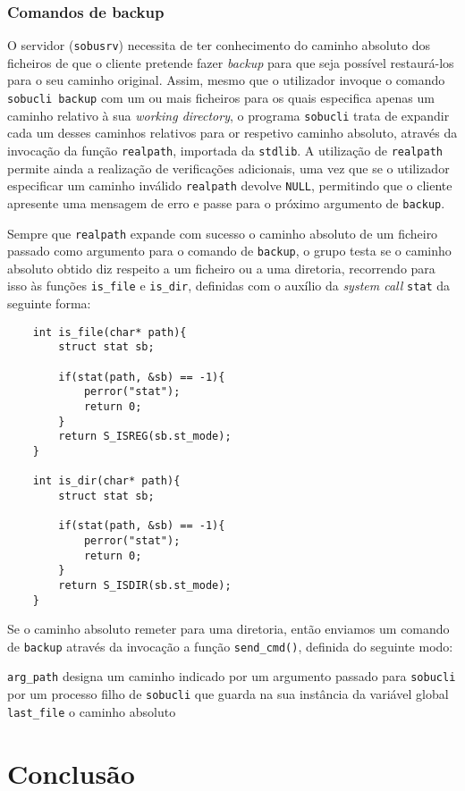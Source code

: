 \documentclass[a4paper,12pt,titlepage,draft,portuguese]{article}
\begin{document}
\subsubsection{Comandos de backup}

O servidor (\texttt{sobusrv}) necessita de ter conhecimento do caminho absoluto dos ficheiros de que o cliente pretende fazer \emph{backup} para que seja possível restaurá-los para o seu caminho original. Assim, mesmo que o utilizador invoque o comando \texttt{sobucli backup} com um ou mais ficheiros para os quais especifica apenas um caminho relativo à sua \emph{working directory}, o programa \texttt{sobucli} trata de expandir cada um desses caminhos relativos para or respetivo caminho absoluto, através da invocação da função \texttt{realpath}, importada da \texttt{stdlib}. A utilização de \texttt{realpath} permite ainda a realização de verificações adicionais, uma vez que se o utilizador especificar um caminho inválido \texttt{realpath} devolve \texttt{NULL}, permitindo que o cliente apresente uma mensagem de erro e passe para o próximo argumento de \texttt{backup}.

Sempre que \texttt{realpath} expande com sucesso o caminho absoluto de um ficheiro passado como argumento para o comando de \texttt{backup}, o grupo testa se o caminho absoluto obtido diz respeito a um ficheiro ou a uma diretoria, recorrendo para isso às funções \texttt{is\_file} e \texttt{is\_dir}, definidas com o auxílio da \emph{system call} \texttt{stat} da seguinte forma:

	\begin{verbatim}
	int is_file(char* path){
		struct stat sb;

		if(stat(path, &sb) == -1){
			perror("stat");
			return 0;
		}
		return S_ISREG(sb.st_mode);
	}

	int is_dir(char* path){
		struct stat sb;

		if(stat(path, &sb) == -1){
			perror("stat");
			return 0;
		}
		return S_ISDIR(sb.st_mode);
	}
	\end{verbatim}

Se o caminho absoluto remeter para uma diretoria, então enviamos um comando de \texttt{backup} através da invocação a função \texttt{send\_cmd()}, definida do seguinte modo:

	

\texttt{arg_path} designa um caminho indicado por um argumento passado para \texttt{sobucli} por um processo filho de \texttt{sobucli} que guarda na sua instância da variável global \texttt{last_file} o caminho absoluto 

\section{Conclusão}
\end{document}
